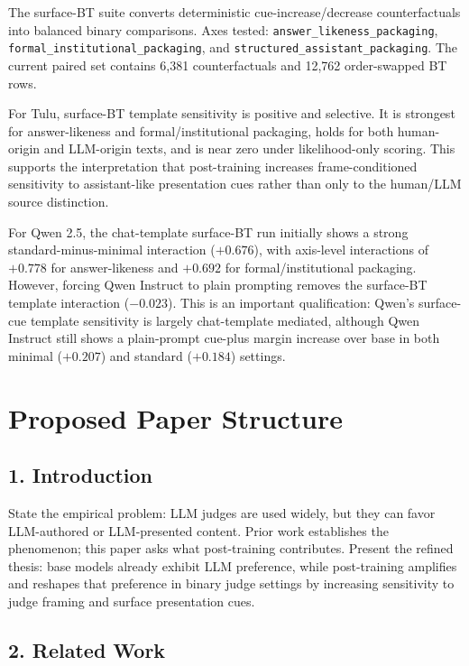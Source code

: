 \documentclass[11pt]{article}
\begin{document}
The surface-BT suite converts deterministic cue-increase/decrease
counterfactuals into balanced binary comparisons. Axes tested:
\texttt{answer\_likeness\_packaging},
\texttt{formal\_institutional\_packaging}, and
\texttt{structured\_assistant\_packaging}. The current paired set contains
6,381 counterfactuals and 12,762 order-swapped BT rows.

For Tulu, surface-BT template sensitivity is positive and selective. It is
strongest for answer-likeness and formal/institutional packaging, holds for
both human-origin and LLM-origin texts, and is near zero under likelihood-only
scoring. This supports the interpretation that post-training increases
frame-conditioned sensitivity to assistant-like presentation cues rather than
only to the human/LLM source distinction.

For Qwen 2.5, the chat-template surface-BT run initially shows a strong
standard-minus-minimal interaction ($+0.676$), with axis-level interactions of
$+0.778$ for answer-likeness and $+0.692$ for formal/institutional packaging.
However, forcing Qwen Instruct to plain prompting removes the surface-BT
template interaction ($-0.023$). This is an important qualification:
Qwen's surface-cue template sensitivity is largely chat-template mediated,
although Qwen Instruct still shows a plain-prompt cue-plus margin increase over
base in both minimal ($+0.207$) and standard ($+0.184$) settings.

\section{Proposed Paper Structure}

\subsection{1. Introduction}

State the empirical problem: LLM judges are used widely, but they can favor
LLM-authored or LLM-presented content. Prior work establishes the phenomenon;
this paper asks what post-training contributes. Present the refined thesis:
base models already exhibit LLM preference, while post-training amplifies and
reshapes that preference in binary judge settings by increasing sensitivity to
judge framing and surface presentation cues.

\subsection{2. Related Work}
\end{document}
